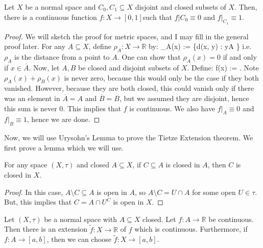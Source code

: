 	\begin{theorem}
		Let $X$ be a normal space and $C_0, C_1\subseteq X$ disjoint and closed subsets of $X$. Then, there is a 
		continuous function $f : X\rightarrow [0, 1]$such that $f|{C_0}\equiv 0$ and $f|_{C_1}\equiv 1$. 
	\end{theorem}
	
	\begin{proof}
		We will sketch the proof for metric spaces, and I may fill in the general proof later. For any $A\subseteq X$, define 
		$\rho_A : X\rightarrow\mathbb R$ by:
		\eq
			\rho_A(x) := \inf \left\{d(x, y) : y\in A \right\}
		\qe
		i.e. $\rho_A$ is the distance from a point to $A$. One can show that $\rho_A(x) = 0$ if and only if $x\in \overline A$. 
		Now, let $A, B$ be closed and disjoint subsets of $X$. Define:
		\eq
			f(x) := .
		\qe
		Note $\rho_A(x) + \rho_B(x)$ is never zero, because this would only be the case if they both vanished. However, 
		because they are both closed, this could vanish only if there was an element in $\overline A = A$ and $\overline B = 
		B$, but we assumed they are disjoint, hence this sum is never 0. This implies that $f$ is continuous. We also have 
		$f|_A\equiv 0$ and $f|_B\equiv 1$, hence we are done.
	\end{proof}
	
	Now, we will use Urysohn's Lemma to prove the Tietze Extension theorem. We first prove a lemma which we will 
	use.
	
	\begin{lemma}
		For any space $(X, \tau)$ and closed $A\subseteq X$, if $C\subseteq A$ is closed in $A$, then $C$ is closed in 
		$X$.
	\end{lemma}
	
	\begin{proof}
		In this case, $A\setminus C\subseteq A$ is open in $A$, so $A\setminus C = U\cap A$ for some open $U\in 
		\tau$. But, this implies that $C = A\cap U^C$ is open in $X$. 
	\end{proof}
	
	\begin{theorem}
		Let $(X, \tau)$ be a normal space with $A\subseteq X$ closed. Let $f : A\rightarrow\mathbb R$ be continuous. 
		Then there is an extension $\tilde f : X\rightarrow\mathbb R$ of $f$ which is continuous. Furthermore, if $f : 
		A\rightarrow [a, b]$, then we can choose $\tilde f : X\rightarrow [a, b]$. 
	\end{theorem}
	
